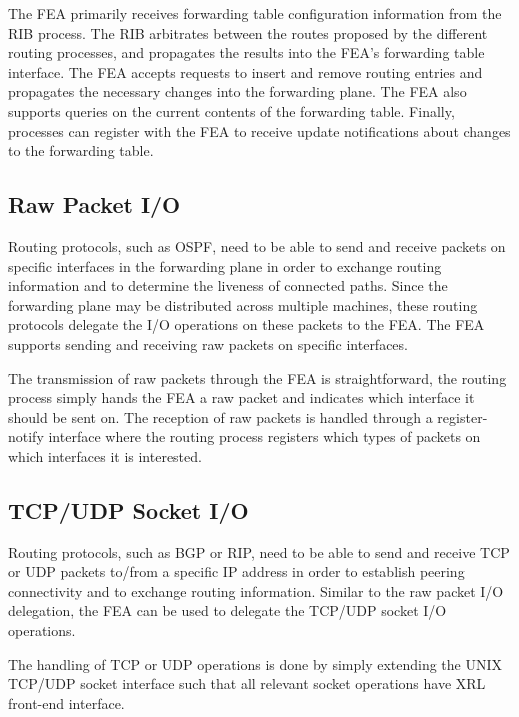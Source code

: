 \documentclass[11pt]{article}
\begin{document}
The FEA primarily receives forwarding table configuration information from the
RIB process.  The RIB arbitrates between the routes proposed by the
different routing processes, and propagates the results into the FEA's
forwarding table interface.  The FEA accepts requests to insert and
remove routing entries and propagates the necessary changes into the
forwarding plane.  The FEA also supports queries on the current
contents of the forwarding table.
Finally, processes can register with the FEA to receive update notifications
about changes to the forwarding table.

\subsection{Raw Packet I/O}
\label{sec:introduction:raw_packet_io}

Routing protocols, such as OSPF, need to be able to send and receive
packets on specific interfaces in the forwarding plane in order to
exchange routing information and to determine the liveness of connected
paths.  Since the forwarding plane may be distributed across multiple
machines, these routing protocols delegate the I/O operations on these
packets to the FEA.  The FEA supports sending and receiving raw packets
on specific interfaces.

The transmission of raw packets through the FEA is straightforward, the
routing process simply hands the FEA a raw packet and indicates which
interface it should be sent on.  The reception of raw packets is handled
through a register-notify interface where the routing process registers
which types of packets on which interfaces it is interested.

\subsection{TCP/UDP Socket I/O}
\label{sec:introduction:tcp_udp_socket_io}

Routing protocols, such as BGP or RIP, need to be able to send and receive
TCP or UDP packets to/from a specific IP address in order to establish
peering connectivity and to exchange routing information.
Similar to the raw packet I/O delegation, the FEA can be used to
delegate the TCP/UDP socket I/O operations.

The handling of TCP or UDP operations is done by simply extending the
UNIX TCP/UDP socket interface such that all relevant socket operations
have XRL front-end interface.
\end{document}
